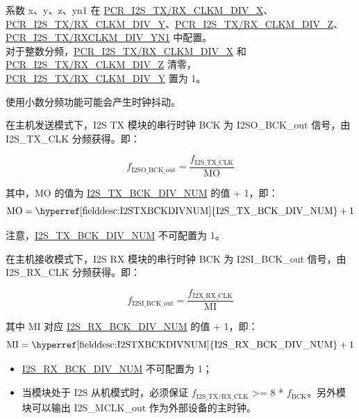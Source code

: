 \documentclass[main\_\_CN.tex]{subfiles}
\begin{document}
系数 x、y、z、yn1 在 \hyperref[fielddesc:PCRI2STXCLKMDIVX]{PCR\_I2S\_TX/RX\_CLKM\_DIV\_X}、\hyperref[fielddesc:PCRI2STXCLKMDIVY]{PCR\_I2S\_TX/RX\_CLKM\_DIV\_Y}、\hyperref[fielddesc:PCRI2STXCLKMDIVZ]{PCR\_I2S\_TX/RX\_CLKM\_DIV\_Z}、\hyperref[fielddesc:PCRI2STXCLKMDIVYN1]{PCR\_I2S\_TX/RXCLKM\_DIV\_YN1} 中配置。 \\
对于整数分频，\hyperref[fielddesc:PCRI2STXCLKMDIVX]{PCR\_I2S\_TX/RX\_CLKM\_DIV\_X} 和 \hyperref[fielddesc:PCRI2STXCLKMDIVZ]{PCR\_I2S\_TX/RX\_CLKM\_DIV\_Z} 清零，\hyperref[fielddesc:PCRI2STXCLKMDIVY]{PCR\_I2S\_TX/RX\_CLKM\_DIV\_Y} 置为 1。

\begin{tiplisting}
使用小数分频功能可能会产生时钟抖动。
\end{tiplisting}

在主机发送模式下，I2S TX 模块的串行时钟 BCK 为 I2SO\_BCK\_out 信号，由 I2S\_TX\_CLK 分频获得。即：

$$f_{\textrm{I2SO\_BCK\_out}} = \frac{f_{\textrm{I2S\_TX\_CLK}}}{\textrm{MO}}$$


其中，MO 的值为 \hyperref[fielddesc:I2STXBCKDIVNUM]{I2S\_TX\_BCK\_DIV\_NUM} 的值 + 1，即：
$$ \textrm{MO} = \textrm{\hyperref[fielddesc:I2STXBCKDIVNUM]{I2S\_TX\_BCK\_DIV\_NUM}} + 1 $$

\vspace{-1em}
\begin{tiplisting}
注意，\hyperref[fielddesc:I2STXBCKDIVNUM]{I2S\_TX\_BCK\_DIV\_NUM} 不可配置为 1。
\end{tiplisting}


在主机接收模式下，I2S RX 模块的串行时钟 BCK 为 I2SI\_BCK\_out 信号，由 I2S\_RX\_CLK 分频获得。即：

$$f_{\textrm{I2SI\_BCK\_out}} = \frac{f_{\textrm{I2X\_RX\_CLK}}}{\textrm{MI}}$$

其中 MI 对应 \hyperref[fielddesc:I2SRXBCKDIVNUM]{I2S\_RX\_BCK\_DIV\_NUM} 的值 + 1，即：
$$ \textrm{MI} = \textrm{\hyperref[fielddesc:I2STXBCKDIVNUM]{I2S\_RX\_BCK\_DIV\_NUM}} + 1 $$

\begin{tiplisting}
\vspace{-2em}
\begin{itemize}
    \item \hyperref[fielddesc:I2SRXBCKDIVNUM]{I2S\_RX\_BCK\_DIV\_NUM} 不可配置为 1；
    \item 当模块处于 I2S 从机模式时，必须保证 $f_{\textrm{I2S\_TX/RX\_CLK}}$ >= 8 * $f_{\textrm{BCK}}$。另外模块可以输出 I2S\_MCLK\_out 作为外部设备的主时钟。
\end{itemize}
\end{tiplisting}
\end{document}
